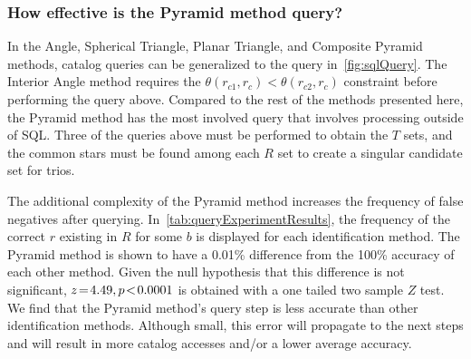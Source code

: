 \documentclass[conference]{IEEEtran}
\begin{document}
    \enlargethispage{-\baselineskip} \enlargethispage{-\baselineskip}
    \subsubsection{How effective is the Pyramid method query?}
    In the Angle, Spherical Triangle, Planar Triangle, and Composite Pyramid methods, catalog queries can be
    generalized to the query in~\autoref{fig:sqlQuery}.
    The Interior Angle method requires the $\theta(r_{c1}, r_{c})\!<\!\theta(r_{c2}, r_c)$ constraint before performing the
    query above.
    Compared to the rest of the methods presented here, the Pyramid method has the most involved query that involves
    processing outside of SQL\@.
    Three of the queries above must be performed to obtain the $T$ sets, and the common stars must be
    found among each $R$ set to create a singular candidate set for trios.


    The additional complexity of the Pyramid method increases the frequency of false negatives after querying.
    In~\autoref{tab:queryExperimentResults}, the frequency of the correct $r$ existing in $R$ for some $b$ is displayed
    for each identification method.
    The Pyramid method is shown to have a 0.01\% difference from the 100\% accuracy of each other method.
    Given the null hypothesis that this difference is not significant, $z \!=\! 4.49, p\!<\!0.0001$ is obtained with a
    one tailed two sample $Z$ test.
    We find that the Pyramid method's query step is less accurate than other identification methods.
    Although small, this error will propagate to the next steps and will result in more catalog accesses and/or a lower
    average accuracy.
\end{document}
